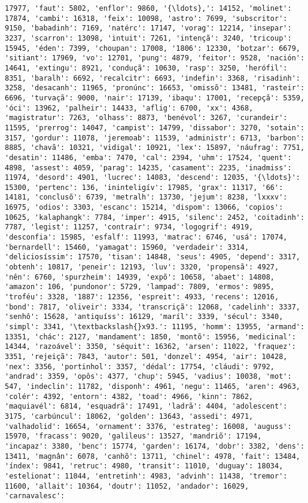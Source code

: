 \documentclass[11pt]{article}
\begin{document}
\begin{Verbatim}[commandchars=\\\{\}]
17977, 'faut': 5802, 'enflor': 9860, '{\ldots},': 14152, 'molinet': 17874, 'cambi': 16318, 'feix': 10098, 'astro': 7699, 'subscritor': 9150, 'babadinh': 7169, 'natérc': 17147, 'vorag': 12214, 'insepar': 3237, 'scarron': 13098, 'intuit': 7261, 'intençã': 3240, 'tricoup': 15945, 'éden': 7399, 'choupan': 17008, '1806': 12330, 'botzar': 6679, 'sitiant': 17969, 'vo': 12701, 'pung': 4879, 'feitor': 9528, 'nación': 14641, 'extingu': 8921, 'conduçã': 10630, 'rasp': 3250, 'herófil': 8351, 'baralh': 6692, 'recalcitr': 6693, 'indefin': 3368, 'risadinh': 3258, 'desacanh': 11965, 'pronúnc': 16653, 'omissõ': 13481, 'rasteir': 6696, 'turvaçã': 9000, 'nair': 17139, 'ibaqu': 17001, 'recepçã': 5359, 'óci': 13962, 'palheir': 14433, 'aflig': 6700, 'xx': 4368, 'magistratur': 7263, 'olhass': 8873, 'benévol': 3267, 'curandeir': 11595, 'prerrog': 14047, 'campist': 14799, 'dissabor': 3270, 'sotain': 3157, 'gordur': 11078, 'jeremoab': 11539, 'administr': 6713, 'barbon': 8885, 'chavã': 10321, 'vidigal': 10921, 'lex': 15897, 'náufrag': 7751, 'desatin': 11486, 'emba': 7470, 'cal': 2394, 'uhm': 17524, 'quent': 4898, 'assest': 4059, 'parag': 14235, 'casament': 2235, 'inadmiss': 11974, 'desord': 4901, 'lucrec': 14083, 'descend': 12035, '{\ldots}': 15300, 'pertenc': 136, 'ininteligív': 17985, 'grax': 11317, '66': 14181, 'conclusõ': 6739, 'metralh': 13730, 'jejum': 8238, 'lxxxv': 16975, 'odios': 3303, 'escanc': 15214, 'dispom': 13066, 'copios': 10625, 'kalaphangk': 7784, 'imper': 4915, 'silenc': 2452, 'coitadinh': 7787, 'legist': 11257, 'contraír': 9734, 'logogrif': 4919, 'desconfia': 15985, 'esfalf': 11993, 'matrac': 6746, 'usá': 17074, 'bernardell': 15460, 'yamagat': 15960, 'verdadeir': 3314, 'deliciosíssim': 17570, 'tisan': 14848, 'seus': 4905, 'depend': 3317, 'obtenh': 10817, 'peneir': 12193, 'luv': 3320, 'propensã': 4927, 'nên': 6760, 'spurzheim': 14939, 'expõ': 10658, 'abaet': 14808, 'amazon': 106, 'pundonor': 5729, 'lampad': 7809, 'ermos': 9895, 'troféu': 3328, '1887': 12356, 'espreit': 4933, 'recens': 12016, 'bond': 7817, 'oliveir': 3334, 'transcriçã': 12068, 'cadelinh': 3337, 'senhô': 15628, 'antiquíss': 16129, 'maríl': 3339, 'sécul': 3340, 'simpl': 3341, '\textbackslash{}x93.': 11195, 'homm': 13955, 'armand': 13351, 'chác': 2127, 'mandament': 1850, 'montõ': 15956, 'medicinal': 14344, 'razoável': 3350, 'séquit': 16362, 'arsen': 11022, 'fraquez': 3351, 'rejeiçã': 7843, 'autor': 501, 'donzel': 4954, 'air': 10428, 'nex': 3356, 'portinhol': 3357, 'dédal': 17754, 'cláudi': 9792, 'andrad': 3359, 'opôs': 4377, 'chup': 5945, 'vadius': 10038, 'mot': 547, 'indeclin': 11782, 'disponh': 4961, 'negu': 11465, 'aren': 4963, 'colér': 4392, 'entorn': 4382, 'toad': 4966, 'kinn': 7862, 'maquiavél': 6814, 'esquadrã': 17491, 'ladrã': 4404, 'adolescent': 3175, 'carbúncul': 18062, 'golden': 13643, 'assedi': 4971, 'valhadolid': 16654, 'ornament': 3376, 'estrateg': 16008, 'auguss': 15970, 'fracass': 9020, 'galileus': 13527, 'mandriõ': 17194, 'incapaz': 3380, 'benc': 15774, 'garden': 16174, 'dobr': 3382, 'dens': 13411, 'magnân': 6078, 'canhõ': 13711, 'chinel': 4978, 'fait': 13484, 'índex': 9841, 'retruc': 4980, 'transit': 11010, 'duguay': 18034, 'estelionat': 11044, 'entretinh': 4983, 'advinh': 11438, 'tremor': 11600, 'allait': 10364, 'doutr': 11052, 'andador': 16029, 'carnavalesc': 
\end{Verbatim}
\end{document}
